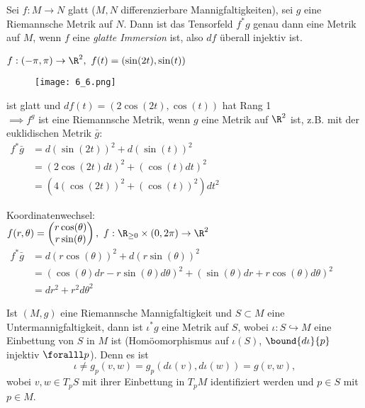 \lecture\begin{lem} 
	Sei $ f: M \to N $ glatt ($M,N$ differenzierbare Mannigfaltigkeiten), sei $g$ eine Riemannsche Metrik auf $N$. Dann ist das Tensorfeld $ f^*g $ genau dann eine Metrik auf $M$, wenn $f$ eine \emph{glatte Immersion} ist, also $df$ überall injektiv ist.
\end{lem}

\begin{exmp*}
	$ f:(-\pi,\pi)\to \R^2,\ f(t) = (\sin(2t),\sin(t)) $\\
	\begin{minipage}{\linewidth}
		\begin{wrapfigure}{l}{0.1\textwidth}
			\texttt{[image: 6\_6.png]}
		\end{wrapfigure}
		ist glatt und $ df(t) = (2\cos(2t),\cos(t)) $ hat Rang 1\\
		$\implies f^g$ ist eine Riemannsche Metrik, wenn $g$ eine Metrik auf $\R^2$ ist, z.B. mit der euklidischen Metrik $\bar{g}$:\\
		$\begin{aligned}
			f^*\bar{g} &= d(\sin(2t))^2 + d(\sin(t))^2\\
			&= (2\cos(2t)dt)^2 + (\cos(t)dt)^2\\
			&= (4(\cos(2t))^2 + (\cos(t))^2)dt^2
		\end{aligned}$
	\end{minipage}
\end{exmp*}

\begin{exmp*}
	Koordinatenwechsel:\\
	$ f(r,\theta) = \begin{pmatrix}
		r\cos(\theta)\\r\sin(\theta)
	\end{pmatrix} ,\ f: \R_{\geq 0} \times (0,2\pi) \to \R^2$\\
	$ \begin{aligned}
		f^*\bar{g} &= d(r\cos(\theta))^2 + d(r\sin(\theta))^2\\
		&= (\cos(\theta)dr - r\sin(\theta)d\theta)^2 + (\sin(\theta)dr + r\cos(\theta)d\theta)^2\\
		&= dr^2 + r^2d\theta^2
	\end{aligned} $
\end{exmp*}

\begin{defn*}
	Ist $ (M,g) $ eine Riemannsche Mannigfaltigkeit und $S \subset M$ eine Untermannigfaltigkeit, dann ist $\iota^*g$ eine Metrik auf $S$, wobei $\iota: S \hookrightarrow M$ eine Einbettung von $S$ in $M$ ist (Homöomorphismus auf $\iota(S)$, $\bound{d\iota}{p}$ injektiv $\foralll p$). Denn es ist
	\[ \iota \neq g_p(v,w) = g_p(d\iota(v),d\iota(w)) = g(v,w), \]
	wobei $v,w \in T_pS$ mit ihrer Einbettung in $T_pM$ identifiziert werden und $p \in S$ mit $p \in M$.
\end{defn*}

